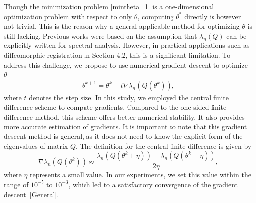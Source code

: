 \documentclass[letterpaper]{article} %
\begin{document}
Though the minimization problem \eqref{mintheta_1} is a one-dimensional optimization problem with respect to only $\theta$, computing $\theta^*$ directly is however not trivial. This is the reason why a general applicable method for optimizing $\theta$ is still lacking. Previous works \cite{ghadimi2014optimal,teixeira2015admm} were based on the assumption that $\lambda_n(Q)$ can be explicitly written for spectral analysis. However, in practical applications such as diffeomorphic registration in Section 4.2, this is a significant limitation. To address this challenge, we propose to use numerical gradient descent to optimize $\theta$
\begin{equation}\label{General}
	\begin{split}
{\theta ^{k + 1}} =  {\theta ^k} - t\nabla \lambda_n\left(Q(\theta^k)\right) ,
 \end{split}
\end{equation}
 where $t$ denotes the step size. In this study, we employed the central finite difference scheme to compute gradients. Compared to the one-sided finite difference method, this scheme offers better numerical stability. It also provides more accurate estimation of gradients. It is important to note that this gradient descent method is general, as it does not need to know the explicit form of the eigenvalues of matrix $Q$. The definition for the central finite difference is given by
\begin{equation*}
	\nabla \lambda_n\left(Q(\theta^k)\right)  \approx \frac{{\lambda_n\left(Q(\theta^k+ \eta)\right) - \lambda_n\left(Q(\theta^k - \eta)\right)}}{2\eta },
\end{equation*}
where $\eta$ represents a small value. In our experiments, we set this value within the range of $10^{-5}$ to $10^{-3}$, which led to a satisfactory convergence of the gradient descent~\eqref{General}.
\end{document}
